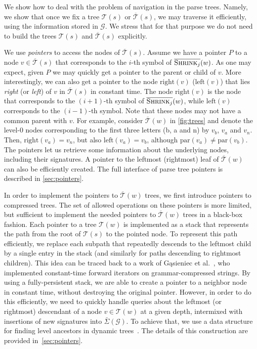 \documentclass[a4paper]{article}
\theoremstyle{remark}
\newcommand{\sigs}{\bar{\Sigma}}
\newcommand{\cshrink}[1]{\ensuremath{\overline{\textsc{Shrink}_{#1}}}}
\newcommand{\str}{w}
\newcommand{\grammar}{\mathcal{G}}
\newcommand{\stree}{\mathcal{T}}
\newcommand{\ustree}{\mathcal{\overline{T}}}
\newcommand{\uspar}{\mathrm{par}}
\newcommand{\usleft}{\mathrm{left}}
\newcommand{\usright}{\mathrm{right}}
\begin{document}
We show how to deal with the problem of navigation in the parse trees.
Namely, we show that once we fix a tree $\stree(s)$ or $\ustree(s)$, we may traverse it efficiently, using the information stored in $\grammar$.
We stress that for that purpose we do not need to build the trees $\stree(s)$ and $\ustree(s)$ explicitly.

We use \emph{pointers} to access the nodes of $\ustree(s)$.
Assume we have a pointer $P$ to a node $v \in \ustree(s)$ that corresponds to the $i$-th symbol of $\cshrink{j}(\str)$.
As one may expect, given $P$ we may quickly get a pointer to the parent or child of $v$.
More interestingly, we can also get a pointer to the node $\usright(v)$ ($\usleft(v)$) that lies \emph{right} (or \emph{left}) of $v$ in $\ustree(s)$
in constant time.
The node $\usright(v)$ is the node that corresponds to the $(i+1)$-th symbol of $\cshrink{j}(\str)$,
while $\usleft(v)$ corresponds to the $(i-1)$-th symbol.
Note that these nodes may not have a common parent with $v$.
For example, consider $\ustree(\str)$ in \cref{fig:trees} and denote the level-0 nodes corresponding to the first three letters (b, a and n) by $v_b$, $v_a$ and $v_n$.
Then, $\usright(v_a) = v_n$, but also $\usleft(v_a) = v_b$, although $\uspar(v_a)\ne \uspar(v_b)$.
The pointers let us retrieve some information about the underlying nodes, including their signatures.
A pointer to the leftmost (rightmost) leaf of $\ustree(\str)$ can also be efficiently created.
The full interface of parse tree pointers is described in \cref{sec:pointers}.

In order to implement the pointers to $\ustree(\str)$ trees, we first introduce
pointers to compressed trees.
The set of allowed operations on these pointers is more limited, but sufficient
to implement the needed pointers to $\ustree(\str)$ trees
in a black-box fashion.
Each pointer to a tree $\stree(\str)$ is implemented as a stack that represents the path from the root of $\stree(s)$ to the pointed node.
To represent this path efficiently, we replace each subpath that repeatedly descends to the leftmost child by a single entry in the stack (and similarly for paths descending to rightmost children).
This idea can be traced back to a work of Gąsieniec et al.~\cite{DBLP:conf/dcc/GasieniecKPS05}, who implemented constant-time
forward iterators on grammar-compressed strings.
By using a fully-persistent stack, we are able to create a pointer to a neighbor node in constant time, without destroying the original pointer.
However, in order to do this efficiently, we need to quickly handle queries about the leftmost (or rightmost) descendant of a node $v\in\stree(\str)$
at a given depth, intermixed with insertions of new signatures into $\sigs(\grammar)$.
To achieve that, we use a data structure for finding level ancestors in dynamic trees~\cite{Alstrup:2000}.
The details of this construction are provided in~\cref{sec:pointers}.
\end{document}
